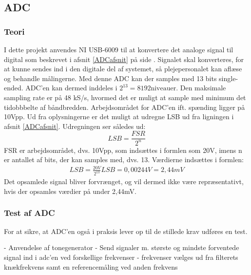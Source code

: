 \subsection{ADC}

\subsubsection{Teori}
I dette projekt anvendes NI USB-6009 til at konvertere det analoge signal til digital som beskrevet i afsnit \ref{ADCafsnit} på side \pageref{ADCafsnit}. Signalet skal konverteres, for at kunne sendes ind i den digitale del af systemet, så plejepersonalet kan aflæse og behandle målingerne. Med denne ADC kan der samples med 13 bits single-ended. ADC'en kan dermed inddeles i $2^{13} = 8192 \text{niveauer}$. Den maksimale sampling rate er på 48 kS/s, hvormed det er muligt at sample med minimum det tidobbbelte af båndbredden. Arbejdsområdet for ADC'en ift. spænding ligger på 10Vpp. \cite{Instruments2014} Ud fra oplysningerne er det muligt at udregne LSB ud fra ligningen i afsnit \ref{ADCafsnit}. Udregningen ser således ud: \\
\begin{equation}
	LSB = \frac{FSR}{2^{n}} 
\end{equation}  
FSR er arbejdsområdet, dvs. 10Vpp, som indsættes i formlen som 20V, imens n er antallet af bits, der kan samples med, dvs. 13.
Værdierne indsættes i formlen: \\
\begin{align}
	LSB = \frac{20V}{2^{13}}
	LSB = 0,00244V = 2,44mV
\end{align}
Det opsamlede signal bliver forvrænget, og vil dermed ikke være repræsentativt, hvis der opsamles værdier på under 2,44mV. 

\subsubsection{Test af ADC}
For at sikre, at ADC'en også i praksis lever op til de stillede krav udføres en test.

- Anvendelse af tonegenerator
- Send signaler m. største og mindste forventede signal ind i adc'en ved forskellige frekvenser - frekvenser vælges ud fra filterets knækfrekvens samt en referencemåling ved anden frekvens